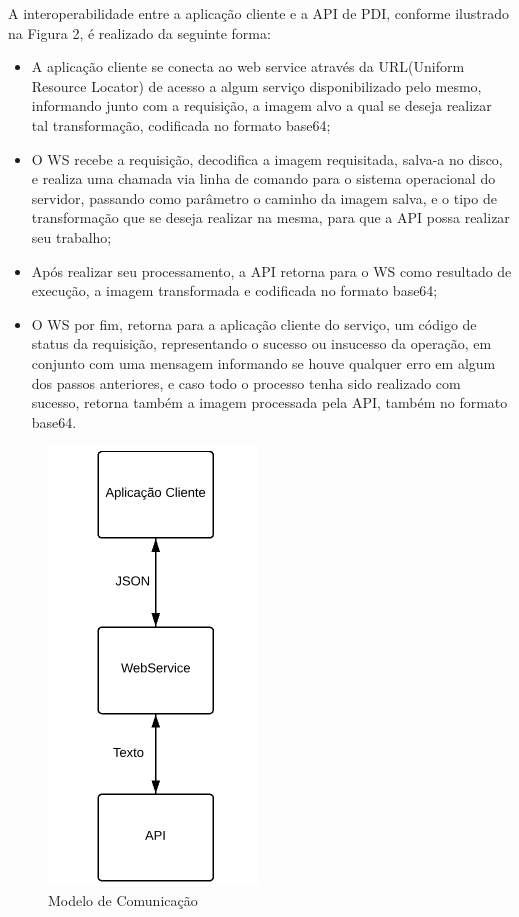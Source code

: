 \documentclass[12pt]{article}
\begin{document}
A interoperabilidade entre a aplicação cliente e a API de PDI, conforme ilustrado na Figura 2, é
realizado da seguinte forma:
\begin{itemize}
	\item A aplicação cliente se conecta ao web service através da URL(Uniform Resource Locator) de acesso a algum serviço disponibilizado pelo mesmo, informando junto com a requisição, a imagem alvo a qual se deseja realizar tal transformação, codificada no formato base64;
	\item O WS recebe a requisição, decodifica a imagem requisitada, salva-a no disco, e realiza uma chamada via linha de comando para o sistema operacional do servidor, passando como parâmetro o caminho da imagem salva, e o tipo de transformação que se deseja realizar na mesma, para que a API possa realizar seu trabalho;
	\item Após realizar seu processamento, a API retorna para o WS como resultado de execução, a imagem transformada e codificada no formato base64;
	\item O WS por fim, retorna para a aplicação cliente do serviço, um código de status da requisição, representando o sucesso ou insucesso da operação, em conjunto com uma mensagem informando se houve qualquer erro em algum dos passos anteriores, e caso todo o processo tenha sido realizado com sucesso, retorna também a imagem processada pela API, também no formato base64.
\end{itemize}

\begin{figure}[ht]
	\centering
	\includegraphics[width=.3\textwidth]{modelo-comunicacao2.png}
	\caption{Modelo de Comunicação}
	\label{fig:Figura2}
\end{figure}
\end{document}

